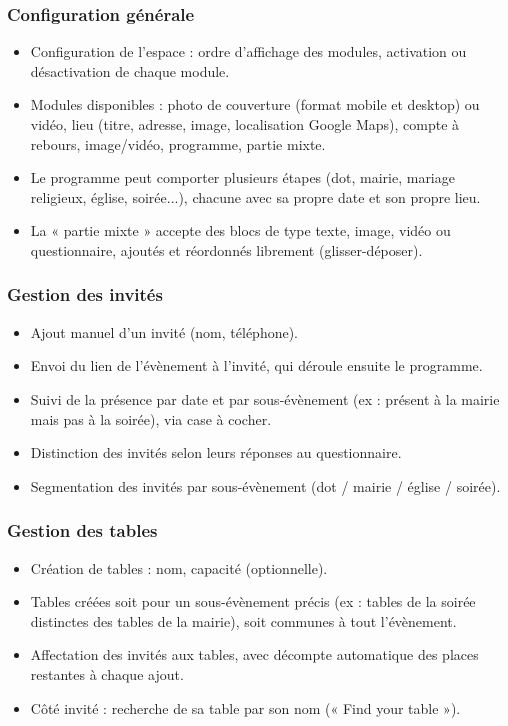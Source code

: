 \documentclass[11pt,a4paper]{article}
\begin{document}
\subsubsection{Configuration générale}
\begin{itemize}[leftmargin=1.2cm]
  \item Configuration de l'espace : ordre d'affichage des modules, activation ou
        désactivation de chaque module.
  \item Modules disponibles : photo de couverture (format mobile et desktop) ou
        vidéo, lieu (titre, adresse, image, localisation Google Maps), compte à
        rebours, image/vidéo, programme, partie mixte.
  \item Le programme peut comporter plusieurs étapes (dot, mairie, mariage religieux,
        église, soirée...), chacune avec sa propre date et son propre lieu.
  \item La « partie mixte » accepte des blocs de type texte, image, vidéo ou
        questionnaire, ajoutés et réordonnés librement (glisser-déposer).
\end{itemize}

\subsubsection{Gestion des invités}
\begin{itemize}[leftmargin=1.2cm]
  \item Ajout manuel d'un invité (nom, téléphone).
  \item Envoi du lien de l'évènement à l'invité, qui déroule ensuite le programme.
  \item Suivi de la présence par date et par sous-évènement (ex : présent à la
        mairie mais pas à la soirée), via case à cocher.
  \item Distinction des invités selon leurs réponses au questionnaire.
  \item Segmentation des invités par sous-évènement (dot / mairie / église / soirée).
\end{itemize}

\subsubsection{Gestion des tables}
\begin{itemize}[leftmargin=1.2cm]
  \item Création de tables : nom, capacité (optionnelle).
  \item Tables créées soit pour un sous-évènement précis (ex : tables de la soirée
        distinctes des tables de la mairie), soit communes à tout l'évènement.
  \item Affectation des invités aux tables, avec décompte automatique des places
        restantes à chaque ajout.
  \item Côté invité : recherche de sa table par son nom (« Find your table »).
\end{itemize}
\end{document}

